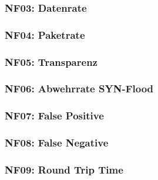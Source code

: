 \documentclass[../review_3.tex]{subfiles}
\begin{document}
\subsubsection{NF03: Datenrate}

\subsubsection{NF04: Paketrate}

\subsubsection{NF05: Transparenz}

\subsubsection{NF06: Abwehrrate SYN-Flood}

\subsubsection{NF07: False Positive}

\subsubsection{NF08: False Negative}


\subsubsection{NF09: Round Trip Time}
\end{document}

